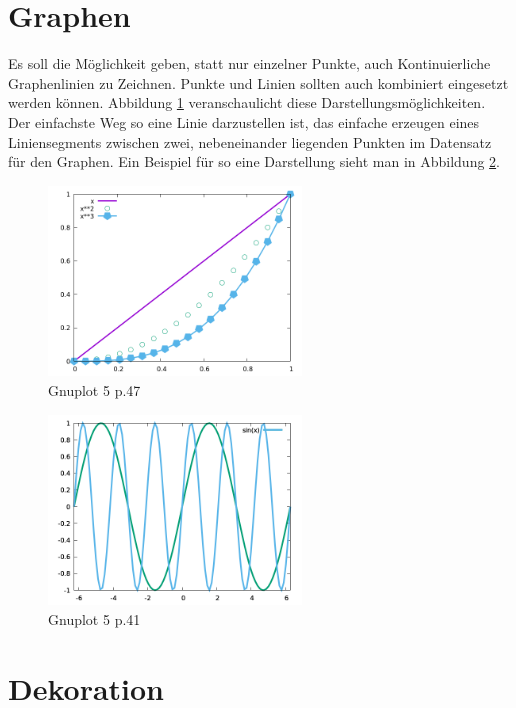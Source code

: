 \section{Graphen}
Es soll die Möglichkeit geben, statt nur einzelner Punkte, auch Kontinuierliche Graphenlinien zu Zeichnen.
Punkte und Linien sollten auch kombiniert eingesetzt werden können.
Abbildung \ref{fig:dots} veranschaulicht diese Darstellungsmöglichkeiten.
Der einfachste Weg so eine Linie darzustellen ist, das einfache erzeugen eines Liniensegments zwischen zwei, nebeneinander liegenden Punkten im Datensatz für den Graphen.
Ein Beispiel für so eine Darstellung sieht man in Abbildung \ref{fig:graphs}.
\begin{figure}[ht]
	\centering
	\includegraphics[width=0.6\textwidth]{fig/dots.png}
	\caption{Gnuplot 5 \cite{Phillips2020} p.47}
	\label{fig:dots}
\end{figure}
\FloatBarrier
\begin{figure}[ht]
	\centering
	\includegraphics[width=0.6\textwidth]{fig/segments.png}
	\caption{Gnuplot 5 \cite{Phillips2020} p.41}
	\label{fig:graphs}
\end{figure}
\FloatBarrier

\section{Dekoration}
